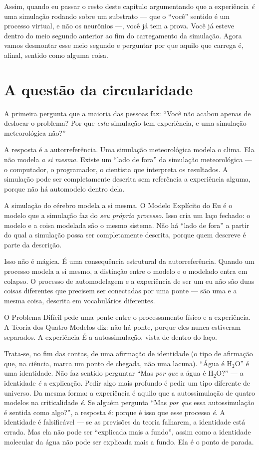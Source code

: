 \documentclass[11pt, twoside, openright]{book}
\begin{document}
Assim, quando eu passar o resto deste capítulo argumentando que a experiência \textit{é} uma simulação rodando sobre um substrato --- que o ``você'' sentido é um processo virtual, e não os neurônios ---, você já tem a prova. Você já esteve dentro do meio segundo anterior ao fim do carregamento da simulação. Agora vamos desmontar esse meio segundo e perguntar por que aquilo que carrega é, afinal, sentido como alguma coisa.

\section*{A questão da circularidade}

A primeira pergunta que a maioria das pessoas faz: ``Você não acabou apenas de deslocar o problema? Por que \textit{esta} simulação tem experiência, e uma simulação meteorológica não?''

A resposta é a autorreferência. Uma simulação meteorológica modela o clima. Ela não modela \textit{a si mesma}. Existe um ``lado de fora'' da simulação meteorológica --- o computador, o programador, o cientista que interpreta os resultados. A simulação pode ser completamente descrita sem referência a experiência alguma, porque não há automodelo dentro dela.

A simulação do cérebro modela a si mesma. O Modelo Explícito do Eu é o modelo que a simulação faz do \textit{seu próprio processo}. Isso cria um laço fechado: o modelo e a coisa modelada são o mesmo sistema. Não há ``lado de fora'' a partir do qual a simulação possa ser completamente descrita, porque quem descreve é parte da descrição.

Isso não é mágica. É uma consequência estrutural da autorreferência. Quando um processo modela a si mesmo, a distinção entre o modelo e o modelado entra em colapso. O processo de automodelagem e a experiência de ser um eu não são duas coisas diferentes que precisem ser conectadas por uma ponte --- são uma e a mesma coisa, descrita em vocabulários diferentes.

O Problema Difícil pede uma ponte entre o processamento físico e a experiência. A Teoria dos Quatro Modelos diz: não há ponte, porque eles nunca estiveram separados. A experiência É a autossimulação, vista de dentro do laço.

Trata-se, no fim das contas, de uma afirmação de identidade (o tipo de afirmação que, na ciência, marca um ponto de chegada, não uma lacuna). ``Água é H$_2$O'' é uma identidade. Não faz sentido perguntar ``Mas \textit{por que} a água é H$_2$O?'' --- a identidade \textit{é} a explicação. Pedir algo mais profundo é pedir um tipo diferente de universo. Da mesma forma: a experiência é aquilo que a autossimulação de quatro modelos na criticalidade \textit{é}. Se alguém pergunta ``Mas \textit{por que} essa autossimulação é sentida como algo?'', a resposta é: porque é isso que esse processo \textit{é}. A identidade é falsificável --- se as previsões da teoria falharem, a identidade está errada. Mas ela não pode ser ``explicada mais a fundo'', assim como a identidade molecular da água não pode ser explicada mais a fundo. Ela é o ponto de parada.
\end{document}

